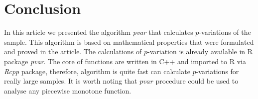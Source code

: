 \documentclass[12pt, a4paper]{article}
\numberwithin{equation}{section}
\begin{document}
  
\section{Conclusion}  
  
In this article we presented the algorithm
\emph{pvar} that calculates
$p$-variations of the sample. 
This algorithm is based on mathematical properties that 
were formulated and proved in the article.
The calculations of $p$-variation
is already available in R package \emph{pvar}.
The core of functions are written in C++
and imported to R via \emph{Rcpp} package,
therefore, algorithm is quite fast can calculate
$p$-variations for really large samples.
It is worth noting that $pvar$ procedure
could be used to analyse any 
piecewise monotone function.
  
  
\end{document}
